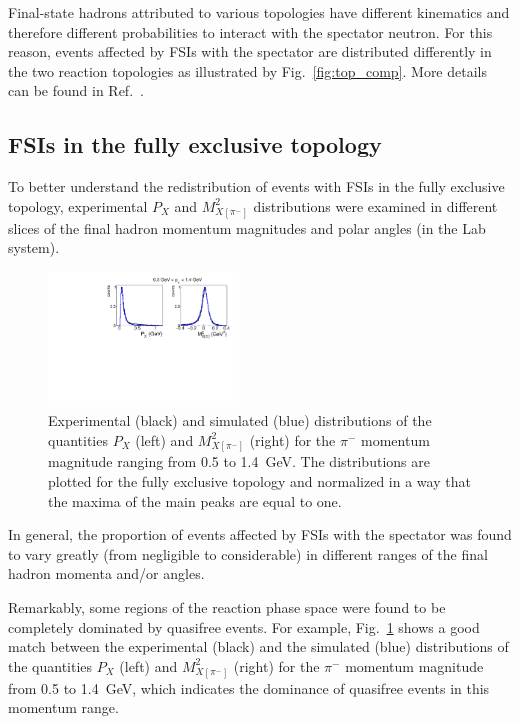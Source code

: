\documentclass[prc,twocolumn,superscriptaddress,showpacs,amssymb,amsmath,amsfonts,aps,nofootinbib]{revtex4-1}
\begin{document}
Final-state hadrons attributed to various topologies have different kinematics and therefore different probabilities to interact with the spectator neutron. For this reason, events affected by FSIs with the spectator are distributed differently in the two reaction topologies as illustrated by Fig.\!~\ref{fig:top_comp}. More details can be found in Ref.\!~\cite{my_thesis:2021}.



\subsection{FSIs in the fully exclusive topology}
\label{Sect:fsi_fully_excl}

To better understand the redistribution of events with FSIs in the fully exclusive topology, experimental $P_{X}$ and  $M^{2}_{X[\pi^{-}]}$ distributions were examined in different slices of the final hadron momentum magnitudes and polar angles (in the Lab system). 


\begin{figure}[htp]
\begin{center}
\includegraphics[width=0.45\textwidth]{pictures/fsi/quasi_free2.pdf}
\caption{\small Experimental (black) and simulated (blue) distributions of the quantities $P_{X}$ (left) and $M^{2}_{X[\pi^{-}]}$ (right) for the $\pi^{-}$ momentum magnitude ranging from 0.5 to 1.4~GeV. The distributions are plotted for the fully exclusive topology and normalized in a way that the maxima of the main peaks are equal to one.} \label{fig:fsi_pim_mom}
\end{center}
\end{figure}

In general, the proportion of events affected by FSIs with the spectator was found to vary greatly (from negligible to considerable) in different ranges of the final hadron momenta and/or angles.  

Remarkably, some regions of the reaction phase space were found to be completely dominated by quasifree events.  For example, Fig.\!~\ref{fig:fsi_pim_mom} shows a good match between the experimental (black) and the simulated (blue) distributions of the quantities $P_{X}$ (left) and $M^{2}_{X[\pi^{-}]}$ (right) for the $\pi^{-}$ momentum magnitude from 0.5 to 1.4~GeV, which indicates the dominance of quasifree events in this momentum range.
\end{document}
